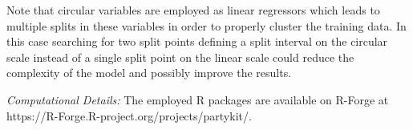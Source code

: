 \documentclass[twoside]{report}
\begin{document}
Note that circular variables are employed as linear regressors which leads to multiple splits
in these variables in order to properly cluster the training data.
In this case searching for two split points defining a split interval on the circular scale instead 
of a single split point on the linear scale could reduce the complexity of the model and possibly 
improve the results.

\medskip

\textit{Computational Details:} The employed \textsf{R} packages are available on \textsf{R}-Forge at
https://R-Forge.R-project.org/projects/partykit/.


\end{document}
